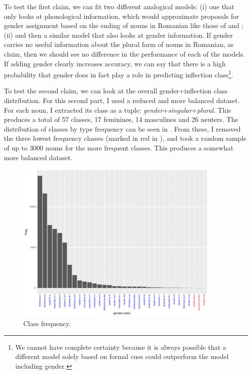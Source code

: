 To test the first claim, we can fit two different analogical models: (i) one that only looks at phonological information, which would approximate proposals for gender assignment based on the ending of nouns in Romanian like those of \textcite{Vrabie.1989} and \textcite{Vrabie.2000}; (ii) and then a similar model that also looks at gender information. If gender carries no useful information about the plural form of nouns in Romanian, as \textcite{Bateman.2010} claim, then we should see no difference in the performance of each of the models. If adding gender clearly increases accuracy, we can say that there is a high probability that gender does in fact play a role in predicting inflection class\footnote{We cannot have complete certainty because it is always possible that a different model solely based on formal cues could outperform the model including gender.}.

To test the second claim, we can look at the overall gender+inflection class distribution. For this second part, I used a reduced and more balanced dataset. For each noun, I extracted its class as a tuple: \textit{gender}+\textit{singular}+\textit{plural}. This produces a total of 57 classes, 17 feminines, 14  masculines and 26 neuters. The distribution of classes by type frequency can be seen in . From these, I removed the three lowest frequency classes (marked in red in ), and took a random sample of up to 3000 nouns for the more frequent classes. This produces a somewhat more balanced dataset.

\begin{figure}[!ptbh]
  \centering
  \includegraphics[width=0.9\textwidth]{./figures/romanian/nclasses-plot.pdf}
  \caption{Class frequency.}\label{fig:rumanian-classes}
\end{figure}

